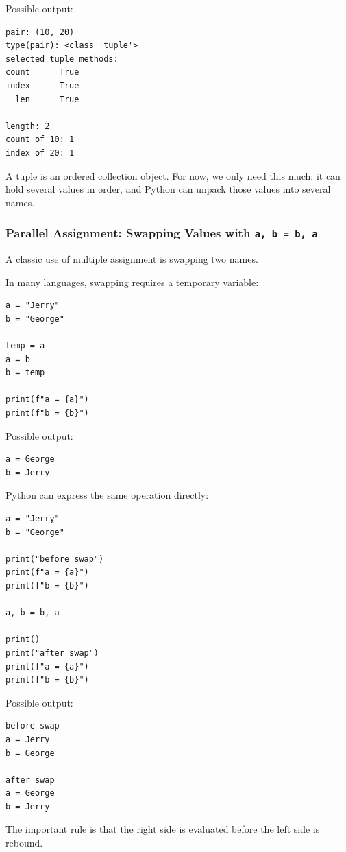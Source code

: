Possible output:

\begin{verbatim}
pair: (10, 20)
type(pair): <class 'tuple'>
selected tuple methods:
count      True
index      True
__len__    True

length: 2
count of 10: 1
index of 20: 1
\end{verbatim}

A tuple is an ordered collection object. For now, we only need this much: it can hold several values in order, and Python can unpack those values into several names.

\subsubsection{Parallel Assignment: Swapping Values with \texttt{a, b = b, a}}

A classic use of multiple assignment is swapping two names.

In many languages, swapping requires a temporary variable:

\begin{verbatim}
a = "Jerry"
b = "George"

temp = a
a = b
b = temp

print(f"a = {a}")
print(f"b = {b}")
\end{verbatim}

Possible output:

\begin{verbatim}
a = George
b = Jerry
\end{verbatim}

Python can express the same operation directly:

\begin{verbatim}
a = "Jerry"
b = "George"

print("before swap")
print(f"a = {a}")
print(f"b = {b}")

a, b = b, a

print()
print("after swap")
print(f"a = {a}")
print(f"b = {b}")
\end{verbatim}

Possible output:

\begin{verbatim}
before swap
a = Jerry
b = George

after swap
a = George
b = Jerry
\end{verbatim}

The important rule is that the right side is evaluated before the left side is rebound.

